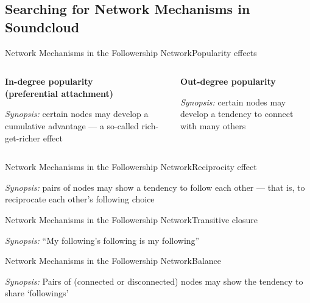 \documentclass[show notes, aspectratio=1610]{beamer}
\begin{document}
\subsection{Searching for Network Mechanisms in Soundcloud}

\begin{frame}{Network Mechanisms in the Followership Network}{Popularity effects}
	\begin{columns}[t]
		\begin{column}{0.5\textwidth}
			\centering 
			\textbf{In-degree popularity\\(preferential attachment)}
			
			

			\raggedright
			\small
			\textit{Synopsis:} certain nodes may develop a cumulative 
			advantage --- a so-called rich-get-richer effect
		\end{column}
		\begin{column}{0.5\textwidth}
			\centering 
			\textbf{Out-degree popularity}

      \vspace{1.4em}
			
			

			\raggedright
			\small
			\textit{Synopsis:} certain nodes may develop a tendency 
			to connect with many others
		\end{column}
	\end{columns}
\end{frame}

\begin{frame}{Network Mechanisms in the Followership Network}{Reciprocity effect}
	\centering 
	

	\raggedright
	\small 
	\textit{Synopsis:} pairs of nodes may show a tendency to follow each 
	other --- that is, to reciprocate each other's following choice 
\end{frame}

\begin{frame}{Network Mechanisms in the Followership Network}{Transitive closure}
	\centering 
	

	\small
	\textit{Synopsis:} ``My following's following is my following'' 
\end{frame}

\begin{frame}{Network Mechanisms in the Followership Network}{Balance}
	\centering 
	

	\small 
	\textit{Synopsis:} Pairs of (connected or disconnected) nodes may 
	show the tendency to share `followings'
\end{frame}
\end{document}
